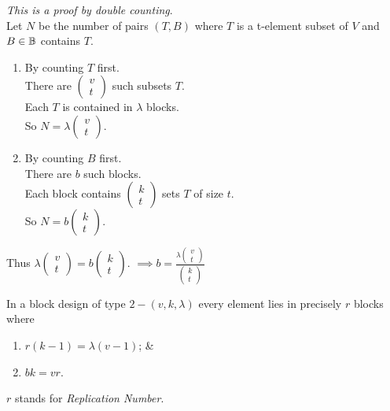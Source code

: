 \documentclass[11pt,a4paper]{article}
\begin{document}
\textit{This is a proof by double counting}.\\%
Let $N$ be the number of pairs $(T,B)$ where $T$ is a t-element subset of $V$ and $B\in\mathbb{B}$ contains $T$.
\begin{enumerate}[label=\roman*)]
	\item By counting $T$ first.\\
	There are $\begin{pmatrix}v\\t\end{pmatrix}$ such subsets $T$.\\
	Each $T$ is contained in $\lambda$ blocks.\\
	So $N=\lambda\begin{pmatrix}v\\t\end{pmatrix}$.
	\item By counting $B$ first.\\
	There are $b$ such blocks.\\
	Each block contains $\begin{pmatrix}k\\t\end{pmatrix}$ sets $T$ of size $t$.\\
	So $N=b\begin{pmatrix}k\\t\end{pmatrix}$.
\end{enumerate}
Thus $\lambda\begin{pmatrix}v\\t\end{pmatrix}=b\begin{pmatrix}k\\t\end{pmatrix}$.
$\implies b=\frac{\lambda\begin{pmatrix}v\\t\end{pmatrix}}{\begin{pmatrix}k\\t\end{pmatrix}}$

In a block design of type $2-(v,k,\lambda)$ every element lies in precisely $r$ blocks where
\begin{enumerate}[label=\roman*)]
	\item $r(k-1)=\lambda(v-1)$; \&
	\item  $bk=vr$.
\end{enumerate}
\nb $r$ stands for \textit{Replication Number}.\\
\end{document}
